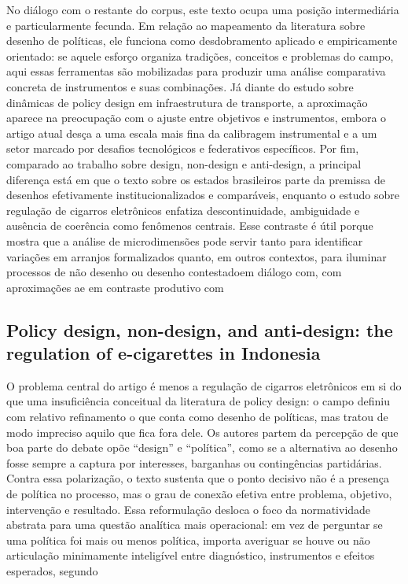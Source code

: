 \documentclass[12pt,a4paper]{article}
\begin{document}
No diálogo com o restante do corpus, este texto ocupa uma posição intermediária e particularmente fecunda. Em relação ao mapeamento da literatura sobre desenho de políticas, ele funciona como desdobramento aplicado e empiricamente orientado: se aquele esforço organiza tradições, conceitos e problemas do campo, aqui essas ferramentas são mobilizadas para produzir uma análise comparativa concreta de instrumentos e suas combinações. Já diante do estudo sobre dinâmicas de policy design em infraestrutura de transporte, a aproximação aparece na preocupação com o ajuste entre objetivos e instrumentos, embora o artigo atual desça a uma escala mais fina da calibragem instrumental e a um setor marcado por desafios tecnológicos e federativos específicos. Por fim, comparado ao trabalho sobre design, non-design e anti-design, a principal diferença está em que o texto sobre os estados brasileiros parte da premissa de desenhos efetivamente institucionalizados e comparáveis, enquanto o estudo sobre regulação de cigarros eletrônicos enfatiza descontinuidade, ambiguidade e ausência de coerência como fenômenos centrais. Esse contraste é útil porque mostra que a análise de microdimensões pode servir tanto para identificar variações em arranjos formalizados quanto, em outros contextos, para iluminar processos de não desenho ou desenho contestado\parencite{lui2026_micro_dimensions}em diálogo com\parencite{lima2021_conectando_problemas}, com aproximações a\parencite{geet2019_policy_design}e em contraste produtivo com\parencite{newman2020_policy_design}



\subsection{Policy design, non-design, and anti-design: the regulation of e-cigarettes in Indonesia}
\label{sec:orgbfceb90}

O problema central do artigo é menos a regulação de cigarros eletrônicos em si do que uma insuficiência conceitual da literatura de policy design: o campo definiu com relativo refinamento o que conta como desenho de políticas, mas tratou de modo impreciso aquilo que fica fora dele. Os autores partem da percepção de que boa parte do debate opõe “design” e “política”, como se a alternativa ao desenho fosse sempre a captura por interesses, barganhas ou contingências partidárias. Contra essa polarização, o texto sustenta que o ponto decisivo não é a presença de política no processo, mas o grau de conexão efetiva entre problema, objetivo, intervenção e resultado. Essa reformulação desloca o foco da normatividade abstrata para uma questão analítica mais operacional: em vez de perguntar se uma política foi mais ou menos política, importa averiguar se houve ou não articulação minimamente inteligível entre diagnóstico, instrumentos e efeitos esperados, segundo\parencite{newman2020_policy_design}
\end{document}
